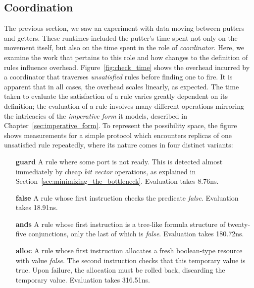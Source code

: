\subsection{Coordination}
The previous section, we saw an experiment with data moving between putters and getters. These runtimes included the putter's time spent not only on the movement itself, but also on the time spent in the role of \textit{coordinator}. Here, we examine the work that pertains to this role and how changes to the definition of rules influence overhead. Figure~\ref{fig:check_time} shows the overhead incurred by a coordinator that traverses \textit{unsatisfied} rules before finding one to fire. It is apparent that in all cases, the overhead scales linearly, as expected. The time taken to evaluate the satisfaction of a rule varies greatly dependent on its definition; the evaluation of a rule involves many different operations mirroring the intricacies of the \textit{imperative form} it models, described in Chapter~\ref{sec:imperative_form}. To represent the possibility space, the figure shows measurements for a simple protocol which encounters replicas of one unsatisfied rule repeatedly, where its nature comes in four distinct variants:
\begin{enumerate}
	\item [\textbf{guard}] A rule where some port is not ready. This is detected almost immediately by cheap \textit{bit vector} operations, as explained in Section~\ref{sec:minimizing_the_bottleneck}. Evaluation takes 8.76ns.
	
	\item [\textbf{false}] A rule whose first instruction checks the predicate \textit{false}. Evaluation takes 18.91ns.
	\item [\textbf{ands}] A rule whose first instruction is a tree-like formula structure of twenty-five conjunctions, only the last of which is \textit{false}. Evaluation takes 180.72ns.
	\item [\textbf{alloc}] A rule whose first instruction allocates a fresh boolean-type resource with value \textit{false}. The second instruction checks that this temporary value is true. Upon failure, the allocation must be rolled back, discarding the temporary value. Evaluation takes 316.51ns.
\end{enumerate}


